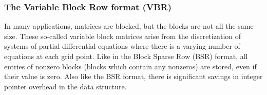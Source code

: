 \documentclass[12pt]{article}
\begin{document}

\subsubsection{The Variable Block Row format (VBR)}
In many applications, matrices are blocked, but the blocks are not all
the same size.  These so-called variable block matrices arise from the
discretization of systems of partial differential equations where there
is a varying number of equations at each grid point.  Like in the Block
Sparse Row (BSR) format, all entries of nonzero blocks (blocks which
contain any nonzeros) are stored, even if their value is zero.  Also
like the BSR format, there is significant savings in integer pointer
overhead in the data structure.
\end{document}
